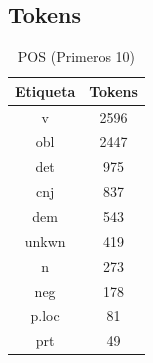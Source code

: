 \documentclass[letterpaper,12pt,oneside]{book}
\theoremstyle{definition}
\begin{document}
	
	\subsection{Tokens}

	
	\begin{table}

		\centering

		\begin{tabular}{c | c}

			\textbf{Etiqueta} & \textbf{Tokens} \\ \hline \hline

			v & 2596 \\

			obl & 2447 \\

			det & 975 \\

			cnj & 837 \\

			dem & 543 \\

			unkwn & 419 \\

			n & 273 \\

			neg & 178 \\

			p.loc & 81 \\

			prt & 49 \\

		\end{tabular}

		\caption{POS (Primeros 10)}

		\label{table_pos_tokens}

	\end{table}

	
	
\end{document}
